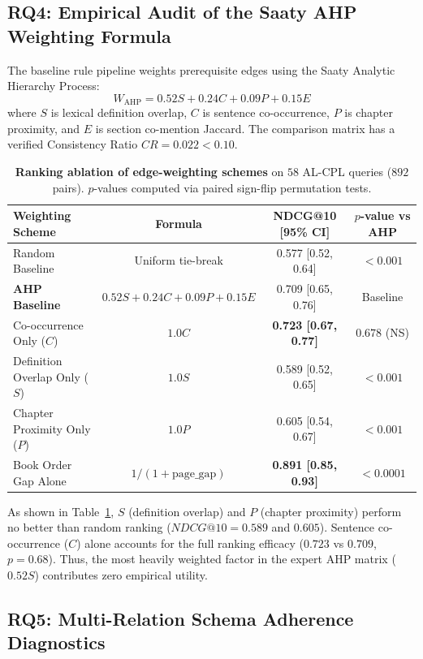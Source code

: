 \documentclass[11pt,a4paper]{article}
\begin{document}
\subsection{RQ4: Empirical Audit of the Saaty AHP Weighting Formula}

The baseline rule pipeline weights prerequisite edges using the Saaty Analytic Hierarchy Process:
\begin{equation}
W_{\text{AHP}} = 0.52 S + 0.24 C + 0.09 P + 0.15 E
\end{equation}
where $S$ is lexical definition overlap, $C$ is sentence co-occurrence, $P$ is chapter proximity, and $E$ is section co-mention Jaccard. The comparison matrix has a verified Consistency Ratio $CR = 0.022 < 0.10$.

\begin{table}[h]
\centering
\small
\begin{tabular}{lccc}
\toprule
\textbf{Weighting Scheme} & \textbf{Formula} & \textbf{NDCG@10 [95\% CI]} & \textbf{$p$-value vs AHP} \\
\midrule
Random Baseline & Uniform tie-break & 0.577 [0.52, 0.64] & $< 0.001$ \\
\textbf{AHP Baseline} & $0.52 S + 0.24 C + 0.09 P + 0.15 E$ & 0.709 [0.65, 0.76] & Baseline \\
Co-occurrence Only ($C$) & $1.0 C$ & \textbf{0.723 [0.67, 0.77]} & $0.678$ (NS) \\
Definition Overlap Only ($S$) & $1.0 S$ & 0.589 [0.52, 0.65] & $< 0.001$ \\
Chapter Proximity Only ($P$) & $1.0 P$ & 0.605 [0.54, 0.67] & $< 0.001$ \\
Book Order Gap Alone & $1 / (1 + \text{page\_gap})$ & \textbf{0.891 [0.85, 0.93]} & $< 0.0001$ \\
\bottomrule
\end{tabular}
\caption{\textbf{Ranking ablation of edge-weighting schemes} on $58$ AL-CPL queries ($892$ pairs). $p$-values computed via paired sign-flip permutation tests.}
\label{tab:weights}
\end{table}

As shown in Table~\ref{tab:weights}, $S$ (definition overlap) and $P$ (chapter proximity) perform no better than random ranking ($NDCG@10 = 0.589$ and $0.605$). Sentence co-occurrence ($C$) alone accounts for the full ranking efficacy ($0.723$ vs $0.709$, $p=0.68$). Thus, the most heavily weighted factor in the expert AHP matrix ($0.52 S$) contributes zero empirical utility.

\subsection{RQ5: Multi-Relation Schema Adherence Diagnostics}
\end{document}
